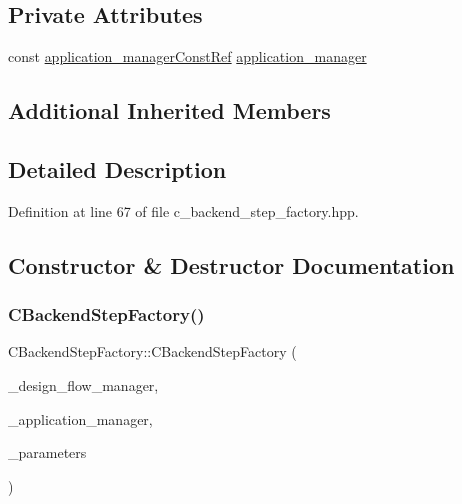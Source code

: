 \subsection*{Private Attributes}
\begin{DoxyCompactItemize}
\item 
const \hyperlink{application__manager_8hpp_abb985163a2a3fb747f6f03b1eaadbb44}{application\+\_\+manager\+Const\+Ref} \hyperlink{classCBackendStepFactory_af7941e69d2f938036744cecacd6ae537}{application\+\_\+manager}
\end{DoxyCompactItemize}
\subsection*{Additional Inherited Members}


\subsection{Detailed Description}


Definition at line 67 of file c\+\_\+backend\+\_\+step\+\_\+factory.\+hpp.



\subsection{Constructor \& Destructor Documentation}
\mbox{\label{classCBackendStepFactory_a7029c2c9d67bc75052c963a3a179e049}} 
\subsubsection{\texorpdfstring{C\+Backend\+Step\+Factory()}{CBackendStepFactory()}}
{\footnotesize\ttfamily C\+Backend\+Step\+Factory\+::\+C\+Backend\+Step\+Factory (\begin{DoxyParamCaption}\item[{const Design\+Flow\+Manager\+Const\+Ref}]{\+\_\+design\+\_\+flow\+\_\+manager,  }\item[{const \hyperlink{application__manager_8hpp_abb985163a2a3fb747f6f03b1eaadbb44}{application\+\_\+manager\+Const\+Ref}}]{\+\_\+application\+\_\+manager,  }\item[{const \hyperlink{Parameter_8hpp_a37841774a6fcb479b597fdf8955eb4ea}{Parameter\+Const\+Ref}}]{\+\_\+parameters }\end{DoxyParamCaption})}



